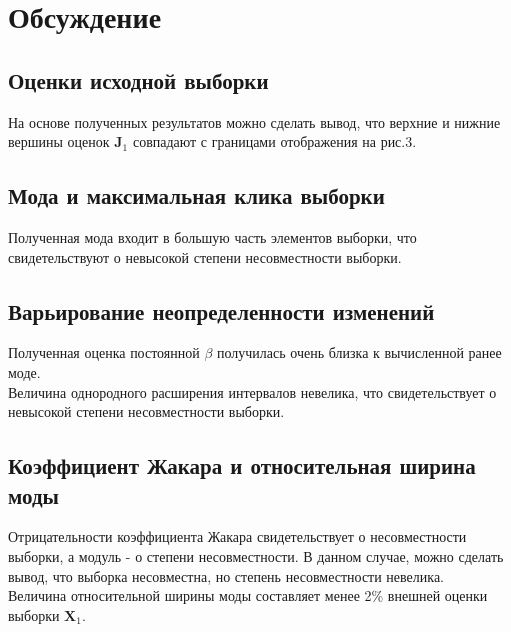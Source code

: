 \section{Обсуждение}

\subsection{Оценки исходной выборки} 

На основе полученных результатов можно сделать вывод, что верхние и нижние вершины оценок $\bm{J}_1$ совпадают с границами отображения на рис.3.

\subsection{Мода и максимальная клика выборки} 

Полученная мода входит в большую часть элементов выборки, что свидетельствуют о невысокой степени несовместности выборки.

\subsection{Варьирование неопределенности изменений}

Полученная оценка постоянной $\beta$ получилась очень близка к вычисленной ранее моде. \\
Величина однородного расширения интервалов невелика, что свидетельствует о невысокой степени несовместности выборки. 

\subsection{Коэффициент Жакара и относительная ширина моды}

Отрицательности коэффициента Жакара свидетельствует о несовместности выборки, а модуль - о степени несовместности. В данном случае, можно сделать вывод, что выборка несовместна, но степень несовместности невелика. \\

Величина относительной ширины моды составляет менее 2\% внешней оценки выборки $\bm{X}_1$.